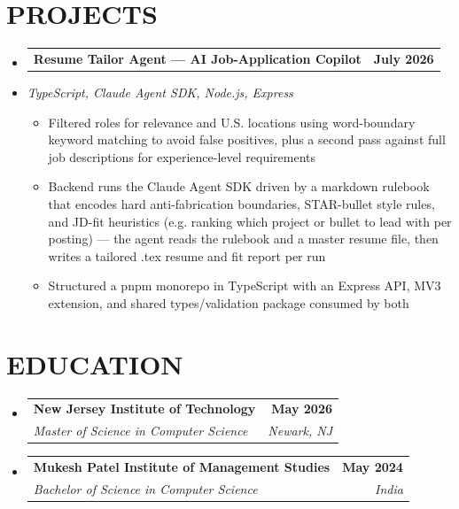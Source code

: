 \documentclass[letterpaper,11pt]{article}
\makeatletter
\newcommand{\resumeItem}[1]{
  \item\small{#1\vspace{-3pt}}
}
\newcommand{\resumeStack}[1]{
  \vspace{1pt}\item\small{\textit{#1}}\vspace{-6pt}
}
\newcommand{\resumeSubheading}[4]{
  \vspace{-3pt}\item
    \begin{tabular*}{1.0\textwidth}[t]{l@{\extracolsep{\fill}}r}
      \textbf{#1} & \textbf{\small #2} \\
      \textit{\small#3} & \textit{\small #4} \\
    \end{tabular*}\vspace{-9pt}
}
\newcommand{\resumeProjectHeading}[2]{
    \item
    \begin{tabular*}{1.001\textwidth}{l@{\extracolsep{\fill}}r}
      \small#1 & \textbf{\small #2}\\
    \end{tabular*}\vspace{-9pt}
}
\newcommand{\resumeItemListStart}{\begin{itemize}[leftmargin=0.15in, label=$\bullet$]}
\newcommand{\resumeItemListEnd}{\end{itemize}\vspace{-7pt}}
\newcommand{\resumeSubHeadingListStart}{\begin{itemize}[leftmargin=0.0in, label={}]}
\newcommand{\resumeSubHeadingListEnd}{\end{itemize}}
\makeatother
\begin{document}
\section{PROJECTS}
\resumeSubHeadingListStart

\resumeProjectHeading
{\textbf{Resume Tailor Agent — AI Job-Application Copilot}}{July 2026}
\vspace{-9pt}
\resumeStack{TypeScript, Claude Agent SDK, Node.js, Express}
\resumeItemListStart
  \resumeItem{Filtered roles for relevance and U.S. locations using word-boundary keyword matching to avoid false positives, plus a second pass against full job descriptions for experience-level requirements}
  \resumeItem{Backend runs the Claude Agent SDK driven by a markdown rulebook that encodes hard anti-fabrication boundaries, STAR-bullet style rules, and JD-fit heuristics (e.g. ranking which project or bullet to lead with per posting) — the agent reads the rulebook and a master resume file, then writes a tailored .tex resume and fit report per run}
  \resumeItem{Structured a pnpm monorepo in TypeScript with an Express API, MV3 extension, and shared types/validation package consumed by both}
\resumeItemListEnd

\resumeSubHeadingListEnd
\vspace{-3pt}
\section{EDUCATION}
\vspace{1pt}
\resumeSubHeadingListStart
\vspace{5pt}
\resumeSubheading
{New Jersey Institute of Technology}{May 2026}
{Master of Science in Computer Science}{Newark, NJ}
\vspace{5pt}
\resumeSubheading
{Mukesh Patel Institute of Management Studies}{May 2024}
{Bachelor of Science in Computer Science}{India}
\resumeSubHeadingListEnd
\end{document}
